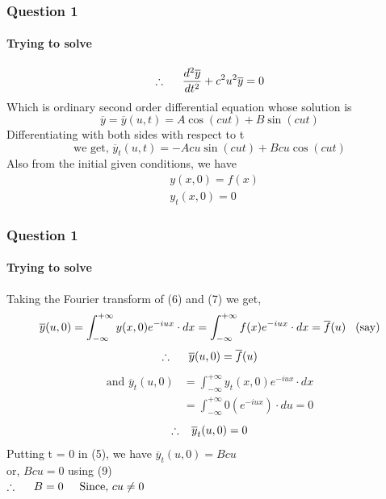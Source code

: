 \documentclass[9 pt]{beamer}
\begin{document}
\begin{frame}[fragile]
	\frametitle{Question 1}
	\framesubtitle{Trying to solve}
	\begin{equation}
		\therefore\hspace{0.5cm}\frac{d^2\overline{y}}{dt^2}+c^2u^2\overline{y}=0
	\end{equation}
	Which is ordinary second order differential equation whose solution is
	\begin{equation}
		\overline{y}=\overline{y}(u,t)=A\cos (cut) + B\sin (cut)
	\end{equation}
	Differentiating with both sides with respect to t
	\begin{equation}
		\textrm{we get, } \overline{y}_t(u,t) = -Acu\sin (cut) + Bcu \cos (cut)
	\end{equation}
	Also from the initial given conditions, we have
	\begin{align}
		  & y(x,0)=f(x) \\
		  & y_t(x,0)=0
	\end{align}
	\transfade[duration=0.6]
\end{frame}


\begin{frame}[fragile]
	\frametitle{Question 1}
	\framesubtitle{Trying to solve}
	Taking the Fourier transform of (6) and (7) we get,
	$$\overline{y}(u,0)=\int_{-\infty}^{+\infty}y(x,0)e^{-iux}\cdot dx=\int_{-\infty}^{+\infty}f(x)e^{-iux}\cdot dx=\overline{f}(u)\hspace{0.3cm} \textrm{(say)} $$
	\begin{equation}
		\therefore\hspace{0.5cm}\overline{y}(u,0)=\overline{f}(u)
	\end{equation}
	\begin{align*}
		\textrm{and } \overline{y}_t(u,0) & =\int_{-\infty}^{+\infty}y_t(x,0)e^{-iux}\cdot dx \\
		                                  	           & =\int_{-\infty}^{+\infty}0(e^{-iux})\cdot du=0
	\end{align*}
	\begin{equation}
		\therefore \hspace{0.3cm}\overline{y}_t(u,0)=0
	\end{equation}
	Putting t = 0 in (5), we have $\overline{y}_t(u,0)=Bcu$ \\
	or, $Bcu=0$ using (9) \\
	\hspace{2cm}$\therefore\hspace{0.5cm} B=0 \hspace{0.5cm} \textrm{Since, }cu \neq 0$ \\
	\transwipe[duration=0.6]
\end{frame}
\end{document}
